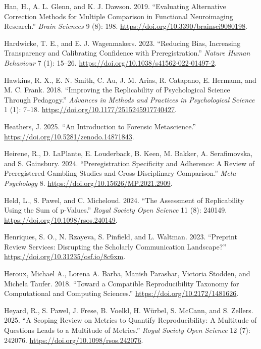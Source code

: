\documentclass[
  letterpaper,
  DIV=11,
  openany,
  fontsize=12pt,
  parskip=half,
  headings=big,
  numbers=noenddot,
  titlepage=false]{scrreprt}
\newlength{\cslhangindent}
\newenvironment{CSLReferences}[2] %
 {\begin{list}{}{%
  \setlength{\itemindent}{0pt}
  \setlength{\leftmargin}{0pt}
  \setlength{\parsep}{0pt}
  \ifodd #1
   \setlength{\leftmargin}{\cslhangindent}
   \setlength{\itemindent}{-1\cslhangindent}
  \fi
  \setlength{\itemsep}{#2\baselineskip}}}
 {\end{list}}
\begin{document}
\begin{CSLReferences}{1}{0}
Han, H., A. L. Glenn, and K. J. Dawson. 2019. {``Evaluating Alternative
Correction Methods for Multiple Comparison in Functional Neuroimaging
Research.''} \emph{Brain Sciences} 9 (8): 198.
\url{https://doi.org/10.3390/brainsci9080198}.

Hardwicke, T. E., and E. J. Wagenmakers. 2023. {``Reducing Bias,
Increasing Transparency and Calibrating Confidence with
Preregistration.''} \emph{Nature Human Behaviour} 7 (1): 15--26.
\url{https://doi.org/10.1038/s41562-022-01497-2}.

Hawkins, R. X., E. N. Smith, C. Au, J. M. Arias, R. Catapano, E.
Hermann, and M. C. Frank. 2018. {``Improving the Replicability of
Psychological Science Through Pedagogy.''} \emph{Advances in Methods and
Practices in Psychological Science} 1 (1): 7--18.
\url{https://doi.org/10.1177/2515245917740427}.

Heathers, J. 2025. {``An Introduction to Forensic Metascience.''}
\url{https://doi.org/10.5281/zenodo.14871843}.

Heirene, R., D. LaPlante, E. Louderback, B. Keen, M. Bakker, A.
Serafimovska, and S. Gainsbury. 2024. {``Preregistration Specificity and
Adherence: A Review of Preregistered Gambling Studies and
Cross-Disciplinary Comparison.''} \emph{Meta-Psychology} 8.
\url{https://doi.org/10.15626/MP.2021.2909}.

Held, L., S. Pawel, and C. Micheloud. 2024. {``The Assessment of
Replicability Using the Sum of p-Values.''} \emph{Royal Society Open
Science} 11 (8): 240149. \url{https://doi.org/10.1098/rsos.240149}.

Henriques, S. O., N. Rzayeva, S. Pinfield, and L. Waltman. 2023.
{``Preprint Review Services: Disrupting the Scholarly Communication
Landscape?''} \url{https://doi.org/10.31235/osf.io/8c6xm}.

Heroux, Michael A., Lorena A. Barba, Manish Parashar, Victoria Stodden,
and Michela Taufer. 2018. {``Toward a Compatible Reproducibility
Taxonomy for Computational and Computing Sciences.''}
\url{https://doi.org/10.2172/1481626}.

Heyard, R., S. Pawel, J. Frese, B. Voelkl, H. Würbel, S. McCann, and S.
Zellers. 2025. {``A Scoping Review on Metrics to Quantify
Reproducibility: A Multitude of Questions Leads to a Multitude of
Metrics.''} \emph{Royal Society Open Science} 12 (7): 242076.
\url{https://doi.org/10.1098/rsos.242076}.


\end{CSLReferences}
\end{document}
